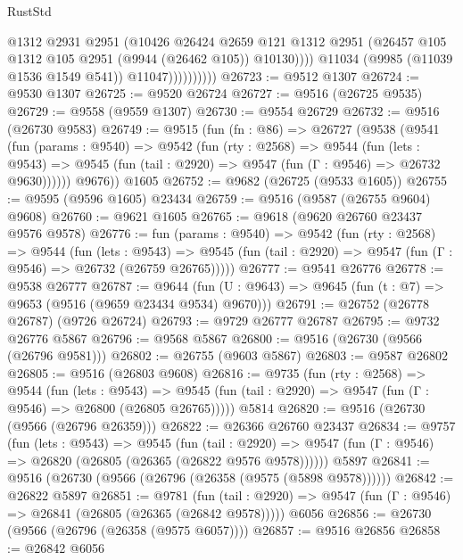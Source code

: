 \begin{lexlean}{RustStd}
\begin{coremodule}
                            @1312
                            @2931
                            @2951
                            (@10426
                              @26424
                              @2659
                              @121
                              @1312
                              @2951
                              (@26457 @105 @1312 @105 @2951 (@9944 (@26462 @105)) @10130))))
                        @11034
                        (@9985 (@11039 @1536 @1549 @541))
                        @11047))))))))))
@26723 := @9512 @1307
@26724 := @9530 @1307
@26725 := @9520 @26724
@26727 := @9516 (@26725 @9535)
@26729 := @9558 (@9559 @1307)
@26730 := @9554 @26729
@26732 := @9516 (@26730 @9583)
@26749 := @9515
    (fun (fn : @86) =>
    @26727
      (@9538
        (@9541
          (fun (params : @9540) =>
          @9542
            (fun (rty : @2568) =>
            @9544
              (fun (lets : @9543) =>
              @9545 (fun (tail : @2920) => @9547 (fun (Γ : @9546) => @26732 @9630))))))
        @9676))
    @1605
@26752 := @9682 (@26725 (@9533 @1605))
@26755 := @9595 (@9596 @1605) @23434
@26759 := @9516 (@9587 (@26755 @9604) @9608)
@26760 := @9621 @1605
@26765 := @9618 (@9620 @26760 @23437 @9576 @9578)
@26776 := fun (params : @9540) =>
  @9542
    (fun (rty : @2568) =>
    @9544
      (fun (lets : @9543) =>
      @9545 (fun (tail : @2920) => @9547 (fun (Γ : @9546) => @26732 (@26759 @26765)))))
@26777 := @9541 @26776
@26778 := @9538 @26777
@26787 := @9644
    (fun (U : @9643) => @9645 (fun (t : @7) => @9653 (@9516 (@9659 @23434 @9534) @9670)))
@26791 := @26752 (@26778 @26787) (@9726 @26724)
@26793 := @9729 @26777 @26787
@26795 := @9732 @26776 @5867
@26796 := @9568 @5867
@26800 := @9516 (@26730 (@9566 (@26796 @9581)))
@26802 := @26755 (@9603 @5867)
@26803 := @9587 @26802
@26805 := @9516 (@26803 @9608)
@26816 := @9735
    (fun (rty : @2568) =>
    @9544
      (fun (lets : @9543) =>
      @9545 (fun (tail : @2920) => @9547 (fun (Γ : @9546) => @26800 (@26805 @26765)))))
    @5814
@26820 := @9516 (@26730 (@9566 (@26796 @26359)))
@26822 := @26366 @26760 @23437
@26834 := @9757
    (fun (lets : @9543) =>
    @9545
      (fun (tail : @2920) =>
      @9547 (fun (Γ : @9546) => @26820 (@26805 (@26365 (@26822 @9576 @9578))))))
    @5897
@26841 := @9516 (@26730 (@9566 (@26796 (@26358 (@9575 (@5898 @9578))))))
@26842 := @26822 @5897
@26851 := @9781
    (fun (tail : @2920) => @9547 (fun (Γ : @9546) => @26841 (@26805 (@26365 (@26842 @9578)))))
    @6056
@26856 := @26730 (@9566 (@26796 (@26358 (@9575 @6057))))
@26857 := @9516 @26856
@26858 := @26842 @6056

\end{coremodule}
\end{lexlean}
